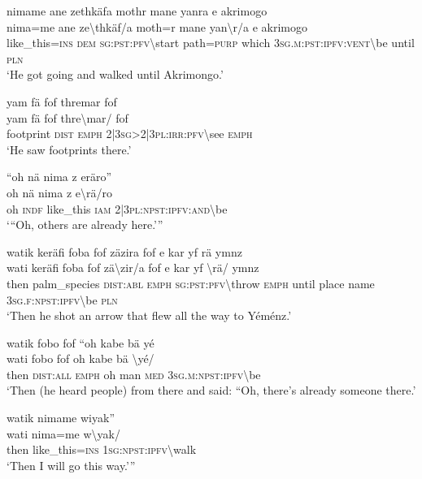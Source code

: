\ea\label{ex:1:a3679}
nimame ane zethkäfa mothr mane yanra e akrimogo\\
\gll nima=me	ane	ze{\textbackslash}thkäf/a	moth=r	mane	yan{\textbackslash}r/a	e	akrimogo\\
     like\_this=\textsc{ins}	\textsc{dem}	\textsc{sg}:\textsc{pst}:\textsc{pfv}{\textbackslash}start	path=\textsc{purp}	which	3\textsc{sg}.\textsc{m}:\textsc{pst}:\textsc{ipfv}:\textsc{vent}{\textbackslash}be	until	\textsc{pln}\\
\glt `He got going and walked until Akrimongo.'
\z

\ea\label{ex:1:a3681}
yam fä fof thremar fof\\
\gll yam	fä	fof	thre{\textbackslash}mar/	fof\\
     footprint	\textsc{dist}	\textsc{emph}	2|3\textsc{sg}>2|3\textsc{pl}:\textsc{irr}:\textsc{pfv}{\textbackslash}see	\textsc{emph}\\
\glt `He saw footprints there.'
\z

\ea\label{ex:1:a3682}
``oh nä nima z eräro''\\
\gll oh	nä	nima	z	e{\textbackslash}rä/ro\\
     oh	\textsc{indf}	like\_this	\textsc{iam}	2|3\textsc{pl}:\textsc{npst}:\textsc{ipfv}:\textsc{and}{\textbackslash}be\\
\glt `{``}Oh, others are already here.'''
\z

\ea\label{ex:1:a3683}
watik keräfi foba fof zäzira fof e kar yf rä ymnz\\
\gll wati	keräfi	foba	fof	zä{\textbackslash}zir/a	fof	e	kar	yf	{\textbackslash}rä/	ymnz\\
     then	palm\_species	\textsc{dist}:\textsc{abl}	\textsc{emph}	\textsc{sg}:\textsc{pst}:\textsc{pfv}{\textbackslash}throw	\textsc{emph}	until	place	name	3\textsc{sg}.\textsc{f}:\textsc{npst}:\textsc{ipfv}{\textbackslash}be	\textsc{pln}\\
\glt `Then he shot an arrow that flew all the way to Yéménz.'
\z

\ea\label{ex:1:a3686}
watik fobo fof ``oh kabe bä yé\\
\gll wati	fobo	fof	oh	kabe	bä	{\textbackslash}yé/\\
     then	\textsc{dist}:\textsc{all}	\textsc{emph}	oh	man	\textsc{med}	3\textsc{sg}.\textsc{m}:\textsc{npst}:\textsc{ipfv}{\textbackslash}be\\
\glt `Then (he heard people) from there and said: ``Oh, there's already someone there.'
\z

\ea\label{ex:1:a3687}
watik nimame wiyak''\\
\gll wati	nima=me	w{\textbackslash}yak/\\
     then	like\_this=\textsc{ins}	1\textsc{sg}:\textsc{npst}:\textsc{ipfv}{\textbackslash}walk\\
\glt `Then I will go this way.'''
\z

